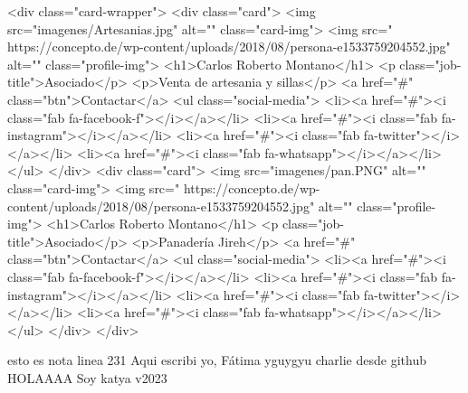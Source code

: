 <div class="card-wrapper">
  <div class="card">
    <img src="imagenes/Artesanias.jpg" alt="" class="card-img">
    <img src=" https://concepto.de/wp-content/uploads/2018/08/persona-e1533759204552.jpg" alt="" class="profile-img">
    <h1>Carlos Roberto Montano</h1>
    <p class="job-title">Asociado</p>
    <p>Venta de artesania y sillas</p>
    <a href="#" class="btn">Contactar</a>
    <ul class="social-media">
      <li><a href="#"><i class="fab fa-facebook-f"></i></a></li> 
      <li><a href="#"><i class="fab fa-instagram"></i></a></li>   
      <li><a href="#"><i class="fab fa-twitter"></i></a></li>   
      <li><a href="#"><i class="fab fa-whatsapp"></i></a></li>     
    </ul>
  </div>
<div class="card">
    <img src="imagenes/pan.PNG" alt="" class="card-img">
    <img src=" https://concepto.de/wp-content/uploads/2018/08/persona-e1533759204552.jpg" alt="" class="profile-img">
    <h1>Carlos Roberto Montano</h1>
    <p class="job-title">Asociado</p>
    <p>Panadería Jireh</p>
    <a href="#" class="btn">Contactar</a>
    <ul class="social-media">
      <li><a href="#"><i class="fab fa-facebook-f"></i></a></li> 
      <li><a href="#"><i class="fab fa-instagram"></i></a></li>   
      <li><a href="#"><i class="fab fa-twitter"></i></a></li>   
      <li><a href="#"><i class="fab fa-whatsapp"></i></a></li>     
    </ul>
  </div>
</div>

esto es nota linea 231
Aqui escribi yo, Fátima
yguygyu
charlie desde github
HOLAAAA Soy katya v2023
